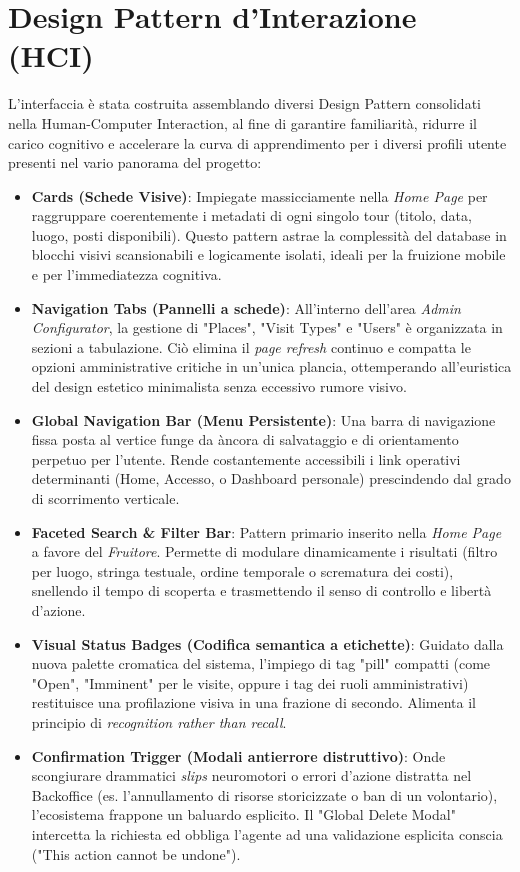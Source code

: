 \section{Design Pattern d'Interazione (HCI)}
L'interfaccia è stata costruita assemblando diversi Design Pattern consolidati nella Human-Computer Interaction, al fine di garantire familiarità, ridurre il carico cognitivo e accelerare la curva di apprendimento per i diversi profili utente presenti nel vario panorama del progetto:
\begin{itemize}
    \item \textbf{Cards (Schede Visive)}: Impiegate massicciamente nella \textit{Home Page} per raggruppare coerentemente i metadati di ogni singolo tour (titolo, data, luogo, posti disponibili). Questo pattern astrae la complessità del database in blocchi visivi scansionabili e logicamente isolati, ideali per la fruizione mobile e per l'immediatezza cognitiva.
    \item \textbf{Navigation Tabs (Pannelli a schede)}: All'interno dell'area \textit{Admin Configurator}, la gestione di "Places", "Visit Types" e "Users" è organizzata in sezioni a tabulazione. Ciò elimina il \textit{page refresh} continuo e compatta le opzioni amministrative critiche in un'unica plancia, ottemperando all'euristica del design estetico minimalista senza eccessivo rumore visivo.
    \item \textbf{Global Navigation Bar (Menu Persistente)}: Una barra di navigazione fissa posta al vertice funge da àncora di salvataggio e di orientamento perpetuo per l'utente. Rende costantemente accessibili i link operativi determinanti (Home, Accesso, o Dashboard personale) prescindendo dal grado di scorrimento verticale.
    \item \textbf{Faceted Search \& Filter Bar}: Pattern primario inserito nella \textit{Home Page} a favore del \textit{Fruitore}. Permette di modulare dinamicamente i risultati (filtro per luogo, stringa testuale, ordine temporale o scrematura dei costi), snellendo il tempo di scoperta e trasmettendo il senso di controllo e libertà d'azione.
    \item \textbf{Visual Status Badges (Codifica semantica a etichette)}: Guidato dalla nuova palette cromatica del sistema, l'impiego di tag "pill" compatti (come "Open", "Imminent" per le visite, oppure i tag dei ruoli amministrativi) restituisce una profilazione visiva in una frazione di secondo. Alimenta il principio di \textit{recognition rather than recall}.
    \item \textbf{Confirmation Trigger (Modali antierrore distruttivo)}: Onde scongiurare drammatici \textit{slips} neuromotori o errori d'azione distratta nel Backoffice (es. l'annullamento di risorse storicizzate o ban di un volontario), l'ecosistema frappone un baluardo esplicito. Il "Global Delete Modal" intercetta la richiesta ed obbliga l'agente ad una validazione esplicita conscia ("This action cannot be undone").

\end{itemize}
